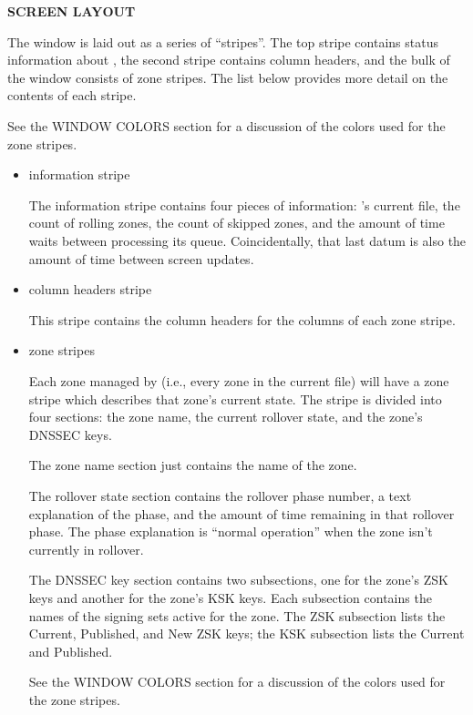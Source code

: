 {\bf SCREEN LAYOUT}

The  window is laid out as a series of ``stripes''.  The
top stripe contains status information about , the second stripe
contains column headers, and the bulk of the window consists of zone stripes.
The list below provides more detail on the contents of each stripe.

See the WINDOW COLORS section for a discussion of the colors used for the
zone stripes.

\begin{itemize}

\item {} information stripe\verb" "

The information stripe contains four pieces of information:  's
current  file, the count of rolling zones, the count of
skipped zones, and the amount of time  waits between processing
its queue.  Coincidentally, that last datum is also the amount of time between
 screen updates.

\item column headers stripe\verb" "

This stripe contains the column headers for the columns of each zone stripe.

\item zone stripes\verb" "

Each zone managed by  (i.e., every zone in the current
 file) will have a zone stripe which describes that zone's
current state.  The stripe is divided into four sections:  the zone name,
the current rollover state, and the zone's DNSSEC keys.

The zone name section just contains the name of the zone.

The rollover state section contains the rollover phase number, a text
explanation of the phase, and the amount of time remaining in that rollover
phase.  The phase explanation is ``normal operation'' when the zone isn't
currently in rollover.

The DNSSEC key section contains two subsections, one for the zone's ZSK keys
and another for the zone's KSK keys.  Each subsection contains the names of
the signing sets active for the zone.  The ZSK subsection lists the Current,
Published, and New ZSK keys; the KSK subsection lists the Current and
Published.

See the WINDOW COLORS section for a discussion of the colors used for the
zone stripes.

\end{itemize}

